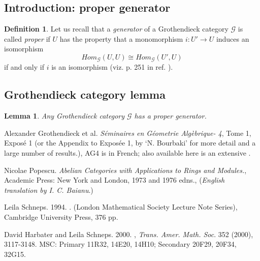 \documentclass[12pt]{article}
\theoremstyle{plain}
\newtheorem{lemma}{Lemma}[section]
\theoremstyle{definition}
\newtheorem{definition}{Definition}[section]
\numberwithin{equation}{section}
\begin{document}
\subsection{Introduction: proper generator}
\begin{definition}

 Let us recall that a \emph{generator} of a Grothendieck category $\mathcal{G}$ is called \emph{proper} if $U$  has the property that a monomorphism  $i: U' \to U$ induces an isomorphism 
$$Hom_{\mathcal{G}}(U,U) \cong Hom_{\mathcal{G}}(U',U)$$ if and only if $i$ is an isomorphism (viz. p. 251 in ref.
\cite{NP65}).
\end{definition}


\subsection{Grothendieck category lemma}

\begin{lemma}
 Any Grothendieck category $\mathcal{G}$ has a proper generator.
\end{lemma}

\begin{thebibliography}{9}

Alexander Grothendieck et al. \emph{S\'eminaires en G\'eometrie Alg\`ebrique- 4}, Tome 1, Expos\'e 1
(or the Appendix to Expos\'ee 1, by `N. Bourbaki' for more detail and a large number of results.),
AG4 is  in French;
also available here is an extensive
.

Nicolae Popescu. {\em Abelian Categories with Applications to Rings and Modules.},
Academic Press: New York and London, 1973 and 1976 edns., ({\em English translation by I. C. Baianu}.)

Leila Schneps. 1994.
.
(London Mathematical Society Lecture Note Series), Cambridge University Press, 376 pp.

David Harbater and Leila Schneps. 2000.
, \emph{Trans. Amer. Math. Soc}. 352 (2000), 3117-3148.
MSC: Primary 11R32, 14E20, 14H10; Secondary 20F29, 20F34, 32G15.

\end{thebibliography}

\end{document}
